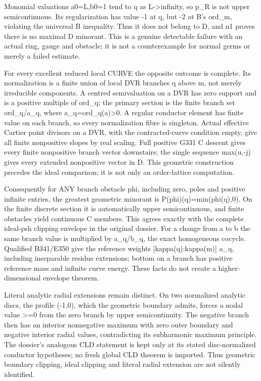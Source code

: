 \documentclass[11pt]{article}
\begin{document}
Monomial valuations a0=L,b0=1 tend to q as L->infinity, so p\_R is not upper semicontinuous. Its regularization has value -1 at q, but -2 at B's ord\_m, violating the universal B inequality. Thus it does not belong to D, and n1 proves there is no maximal D minorant. This is a genuine detectable failure with an actual ring, gauge and obstacle; it is not a counterexample for normal germs or merely a failed estimate.

For every excellent reduced local CURVE the opposite outcome is complete. Its normalization is a finite union of local DVR branches q above m, not merely irreducible components. A centred semivaluation on a DVR has zero support and is a positive multiple of ord\_q; the primary section is the finite branch set ord\_q/a\_q, where a\_q=ord\_q(a)>0. A regular conductor element has finite value on each branch, so every normalization fibre is singleton. Actual effective Cartier point divisors on a DVR, with the contracted-curve condition empty, give all finite nonpositive slopes by real scaling. Full positive G331 C descent gives every finite nonpositive branch vector downstairs; the single sequence max(u,-j) gives every extended nonpositive vector in D. This geometric construction precedes the ideal comparison; it is not only an order-lattice computation.

Consequently for ANY branch obstacle phi, including zero, poles and positive infinite entries, the greatest geometric minorant is P(phi)(q)=min(phi(q),0). On the finite discrete section it is automatically upper semicontinuous, and finite obstacles yield continuous C members. This agrees exactly with the complete ideal-psh clipping envelope in the original dossier. For a change from a to b the same branch value is multiplied by a\_q/b\_q, the exact homogeneous cocycle. Qualified B341/E350 give the reference weights [kappa(q):kappa(m)] a\_q, including inseparable residue extensions; bottom on a branch has positive reference mass and infinite curve energy. These facts do not create a higher-dimensional envelope theorem.

Literal analytic radial extensions remain distinct. On two normalized analytic discs, the profile (-1,0), which the geometric boundary admits, forces a nodal value >=0 from the zero branch by upper semicontinuity. The negative branch then has an interior nonnegative maximum with zero outer boundary and negative interior radial values, contradicting its subharmonic maximum principle. The dossier's analogous CLD statement is kept only at its stated disc-normalized conductor hypotheses; no fresh global CLD theorem is imported. Thus geometric boundary clipping, ideal clipping and literal radial extension are not silently identified.
\end{document}

